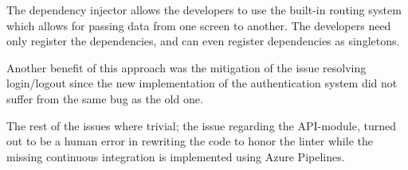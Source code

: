 The dependency injector allows the developers to use the built-in routing system which allows for passing data from one screen to another. The developers need only register the dependencies, and can even register dependencies as singletons.

Another benefit of this approach was the mitigation of the issue resolving login/logout since the new implementation of the authentication system did not suffer from the same bug as the old one.

The rest of the issues where trivial; the issue regarding the API-module, turned out to be a human error in rewriting the code to honor the linter while the missing continuous integration is implemented using Azure Pipelines.